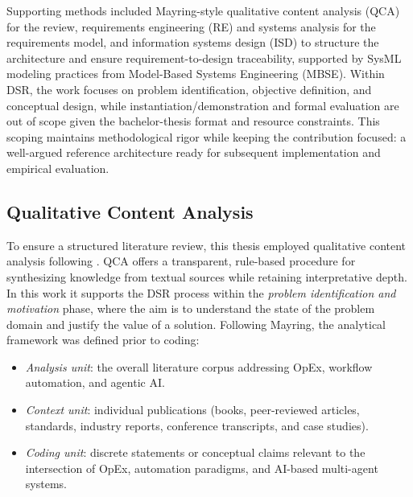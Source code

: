 Supporting methods included Mayring-style qualitative content analysis (QCA) for the review, requirements engineering (RE) and systems analysis for the requirements model, and information systems design (ISD) to structure the architecture and ensure requirement-to-design traceability, supported by SysML modeling practices from Model-Based Systems Engineering (MBSE). Within DSR, the work focuses on problem identification, objective definition, and conceptual design, while instantiation/demonstration and formal evaluation are out of scope given the bachelor-thesis format and resource constraints. This scoping maintains methodological rigor while keeping the contribution focused: a well-argued reference architecture ready for subsequent implementation and empirical evaluation.

\subsection{Qualitative Content Analysis}\label{subsec:qca}
To ensure a structured literature review, this thesis employed qualitative content analysis following \textcite{mayringQualitative2022}. 
QCA offers a transparent, rule-based procedure for synthesizing knowledge from textual sources while retaining interpretative depth. 
In this work it supports the DSR process \parencite{peffersDesign2007} within the \emph{problem identification and motivation} phase, 
where the aim is to understand the state of the problem domain and justify the value of a solution. Following Mayring, the analytical framework was defined prior to coding:
\begin{itemize}
    \item \textit{Analysis unit}: the overall literature corpus addressing OpEx, workflow automation, and agentic AI.\@
    \item \textit{Context unit}: individual publications (books, peer-reviewed articles, standards, industry reports, conference transcripts, and case studies).
    \item \textit{Coding unit}: discrete statements or conceptual claims relevant to the intersection of OpEx, automation paradigms, and AI-based multi-agent systems.
\end{itemize}


